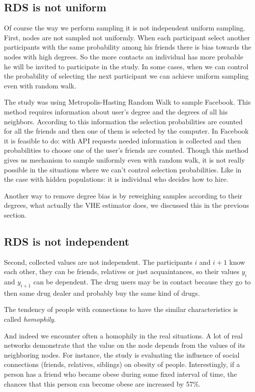 \documentclass[12pt]{report}
\begin{document}
\subsection{RDS is not uniform}


Of course the way we perform sampling it is not independent uniform sampling. 
First, nodes are not sampled not uniformly. When each participant select another  participants with the same probability among his friends there is bias towards the nodes with high degrees. So the more contacts an individual has more probable he will be invited to participate in the study. In some cases, when we can control the probability of selecting the next participant we can achieve uniform sampling even with random walk.

The study \cite{gjoka2009walk} was using Metropolis-Hasting Random Walk to sample Facebook. This method requires information about user's degree and the degrees of all his neighbors. According to this information the selection probabilities are counted for all the friends and then one of them is selected by the computer.
In Facebook it is feasible to do: with API requests needed information is collected and then probabilities to choose one of the user's friends are counted. Though this method gives us mechanism to sample uniformly even with random walk, it is not really possible in the situations where we can't control selection probabilities. Like in the case with hidden populations: it is individual who decides how to hire. 

Another way to remove degree bias is by reweighing samples according to their degrees, what actually the VHE estimator does, we discussed this in the previous section. 

\subsection{RDS is not independent}
Second, collected values are not independent. The participants $i$ and $i+1$ know each other, they can be friends, relatives or just acquaintances, so their values $y_i$ and $y_{i+1}$ can be dependent. The drug users may be in contact because they go to then same drug dealer and probably buy the same kind of drugs. 

The tendency of people with connections to have the similar characteristics is called \textit{homophily}.

And indeed we encounter often a homophily in the real situations. A lot of real networks demonstrate that the value on the node depends from the values of its neighboring nodes. For instance, the study \cite{christakis2007spread} is evaluating the influence of social connections (friends, relatives, siblings) on obesity of people. Interestingly, if a person has a friend who became obese during some fixed interval of time, the chances that this person can become obese are increased by 57\%. 
\end{document}
